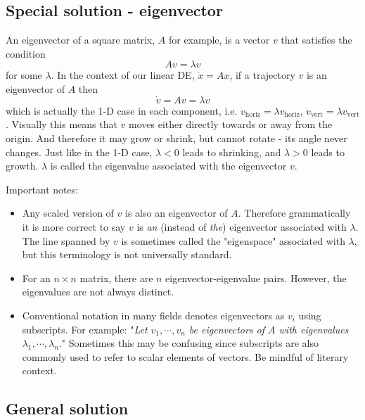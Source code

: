 \documentclass[11pt, oneside]{article}   	%
\begin{document}
\subsection*{Special solution - eigenvector}

An eigenvector of a square matrix, $A$ for example, is a vector $v$ that satisfies the condition
\begin{equation}
Av = \lambda v
\end{equation}
for some $\lambda$.
In the context of our linear DE, $\dot{x} = Ax$, if a trajectory $v$ is an eigenvector of $A$ then
\begin{equation}
\dot{v} = Av = \lambda v
\end{equation}
which is actually the 1-D case in each component,
i.e. $\dot{v}_\mathrm{horiz} = \lambda v_\mathrm{horiz}$, $\dot{v}_\mathrm{vert} = \lambda v_\mathrm{vert}$.
Visually this means that $v$ moves either directly towards or away from the origin.
And therefore it may grow or shrink, but cannot rotate - its angle never changes.
Just like in the 1-D case, $\lambda < 0$ leads to shrinking, and $\lambda > 0$ leads to growth.
$\lambda$ is called the eigenvalue associated with the eigenvector $v$.

Important notes:
\begin{itemize}
\item Any scaled version of $v$ is also an eigenvector of $A$.
Therefore grammatically it is more correct to say $v$ is \textit{an} (instead of \textit{the}) eigenvector associated with $\lambda$.
The line spanned by $v$ is sometimes called the "eigenspace" associated with $\lambda$, but this terminology is not universally standard.
\item For an $n\times n$ matrix, there are $n$ eigenvector-eigenvalue pairs. However, the eigenvalues are not always distinct.
\item Conventional notation in many fields denotes eigenvectors as $v_i$ using subscripts.
For example: "\textit{Let $ v_1,\cdots,v_n $ be eigenvectors of $A$ with eigenvalues $ \lambda_1,\cdots,\lambda_n $}."
Sometimes this may be confusing since subscripts are also commonly used to refer to scalar elements of vectors.
Be mindful of literary context.
\end{itemize}

\subsection*{General solution}
\end{document}
